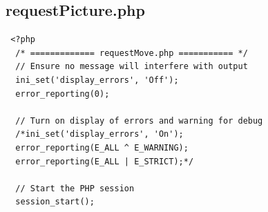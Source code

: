 \documentclass[12pt, a4paper]{article}
\begin{document}
\subsection{requestPicture.php}

\begin{scriptsize}
\begin{ttfamily}
\begin{lstlisting}
 <?php 
  /* ============= requestMove.php =========== */
  // Ensure no message will interfere with output
  ini_set('display_errors', 'Off');
  error_reporting(0);

  // Turn on display of errors and warning for debug
  /*ini_set('display_errors', 'On');
  error_reporting(E_ALL ^ E_WARNING);
  error_reporting(E_ALL | E_STRICT);*/

  // Start the PHP session
  session_start();


\end{lstlisting}
\end{ttfamily}
\end{scriptsize}
\end{document}
